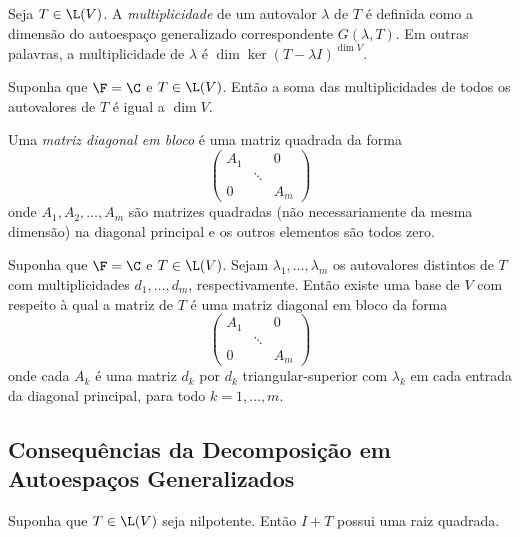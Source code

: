 \documentclass{article}
\begin{document}
\begin{defn}
    Seja \(T \in \L(V)\). A \emph{multiplicidade} de um autovalor \(\lambda\) de \(T\) é definida como a dimensão do autoespaço generalizado correspondente \(G(\lambda, T)\). Em outras palavras, a multiplicidade de \(\lambda\) é \(\dim \ker (T - \lambda I)^{\dim V}\).
\end{defn}

\begin{cor}
    Suponha que \(\F = \C\) e \(T \in \L(V)\). Então a soma das multiplicidades de todos os autovalores de \(T\) é igual a \(\dim V\).
\end{cor}

\begin{defn}
    Uma \emph{matriz diagonal em bloco} é uma matriz quadrada da forma 
    \[
        \begin{pmatrix*}
            A_1 & & 0 \\
            & \ddots & \\
            0 & & A_m
        \end{pmatrix*}
    \]
    \noindent onde \(A_1, A_2, \ldots, A_m\) são matrizes quadradas (não necessariamente da mesma dimensão) na diagonal principal e os outros elementos são todos zero.
\end{defn}

\begin{prop}
    Suponha que \(\F = \C\) e \(T \in \L(V)\). Sejam \(\lambda_1, \ldots, \lambda_m\) os autovalores distintos de \(T\) com multiplicidades \(d_1, \ldots, d_m\), respectivamente. Então existe uma base de \(V\) com respeito à qual a matriz de \(T\) é uma matriz diagonal em bloco da forma
    \[
        \begin{pmatrix*}
            A_1 & & 0 \\
            & \ddots & \\
            0 & & A_m
        \end{pmatrix*}
    \]
    \noindent onde cada \(A_k\) é uma matriz \(d_k\) por \(d_k\) triangular-superior com \(\lambda_k\) em cada entrada da diagonal principal, para todo \(k = 1, \ldots, m\).
\end{prop}

\subsection{Consequências da Decomposição em Autoespaços Generalizados}

\begin{prop}
    Suponha que \(T \in \L(V)\) seja nilpotente. Então \(I + T\) possui uma raiz quadrada.
\end{prop}
\end{document}
